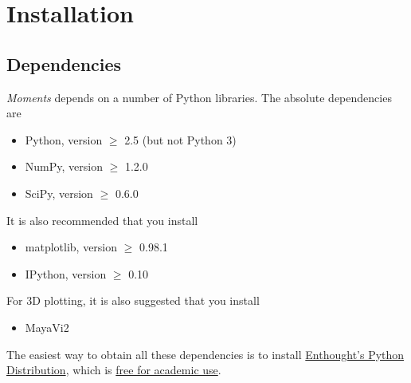 \documentclass[12pt]{article}
\makeatletter
\newcommand{\dadi}{$\partial$a$\partial$i\xspace}
\newcommand{\py}[1]{\lstinline[language=Python, showstringspaces=False]@#1@}
\makeatother
\begin{document}
\section{Installation}

\subsection{Dependencies}

\textit{Moments} depends on a number of Python libraries. The absolute dependencies are
\begin{itemize}
\item Python, version $\geq$ 2.5 (but not Python 3)
\item NumPy, version $\geq$ 1.2.0
\item SciPy, version $\geq$ 0.6.0
\end{itemize}
It is also recommended that you install
\begin{itemize}
\item matplotlib, version $\geq$ 0.98.1
\item IPython, version $\geq$ 0.10
\end{itemize}
For 3D plotting, it is also suggested that you install
\begin{itemize}
\item MayaVi2
\end{itemize}

The easiest way to obtain all these dependencies is to install \href{http://www.enthought.com/products/epd.php}{Enthought's Python Distribution}, which is \href{http://www.enthought.com/products/edudownload.php}{free for academic use}.


\end{document}
